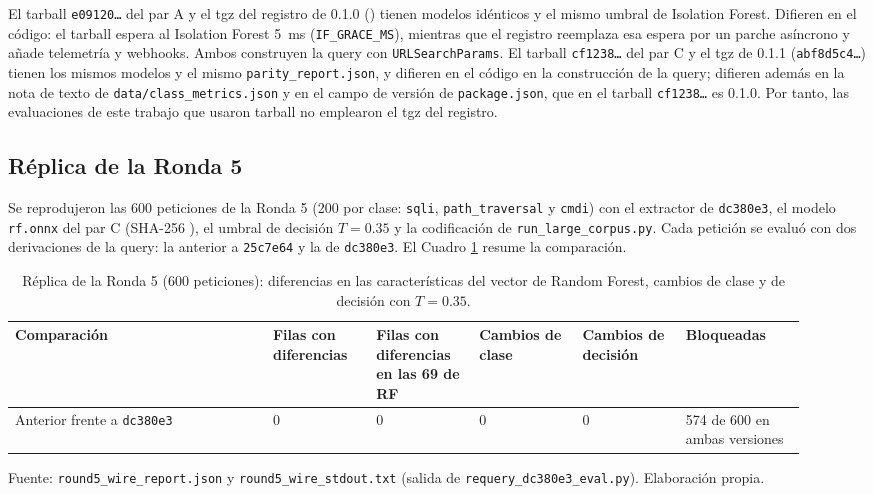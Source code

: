 El tarball \texttt{e09120\ldots} del par A y el tgz del registro de 0.1.0 () tienen modelos idénticos y el mismo umbral de Isolation Forest. Difieren en el código: el tarball espera al Isolation Forest 5~ms (\texttt{IF\_GRACE\_MS}), mientras que el registro reemplaza esa espera por un parche asíncrono y añade telemetría y webhooks. Ambos construyen la query con \texttt{URLSearchParams}. El tarball \texttt{cf1238\ldots} del par C y el tgz de 0.1.1 (\texttt{abf8d5c4\ldots}) tienen los mismos modelos y el mismo \texttt{parity\_report.json}, y difieren en el código en la construcción de la query; difieren además en la nota de texto de \texttt{data/class\_metrics.json} y en el campo de versión de \texttt{package.json}, que en el tarball \texttt{cf1238\ldots} es 0.1.0. Por tanto, las evaluaciones de este trabajo que usaron tarball no emplearon el tgz del registro.

\subsection{Réplica de la Ronda 5}

Se reprodujeron las 600 peticiones de la Ronda 5 (200 por clase: \texttt{sqli}, \texttt{path\_traversal} y \texttt{cmdi}) con el extractor de \texttt{dc380e3}, el modelo \texttt{rf.onnx} del par C (SHA-256 ), el umbral de decisión $T = 0.35$ y la codificación de \texttt{run\_large\_corpus.py}. Cada petición se evaluó con dos derivaciones de la query: la anterior a \texttt{25c7e64} y la de \texttt{dc380e3}. El Cuadro \ref{tabla:anexo-query-replica} resume la comparación.

\begin{table}[htbp]
\centering
\footnotesize
\setlength{\tabcolsep}{3pt}
\begin{tabular}{|p{0.30\linewidth}|p{0.12\linewidth}|p{0.12\linewidth}|p{0.12\linewidth}|p{0.12\linewidth}|p{0.14\linewidth}|}
\hline
\textbf{Comparación} & \textbf{Filas con diferencias} & \textbf{Filas con diferencias en las 69 de RF} & \textbf{Cambios de clase} & \textbf{Cambios de decisión} & \textbf{Bloqueadas} \\ \hline
Anterior frente a \texttt{dc380e3} & 0 & 0 & 0 & 0 & 574 de 600 en ambas versiones \\ \hline
\end{tabular}
\caption{Réplica de la Ronda 5 (600 peticiones): diferencias en las características del vector de Random Forest, cambios de clase y de decisión con $T = 0.35$.}
\label{tabla:anexo-query-replica}
\par\smallskip\footnotesize Fuente: \texttt{round5\_wire\_report.json} y \texttt{round5\_wire\_stdout.txt} (salida de \texttt{requery\_dc380e3\_eval.py}). Elaboración propia.
\end{table}

